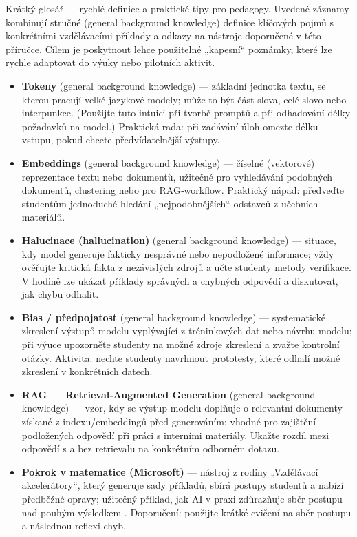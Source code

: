 \documentclass{report}%
\begin{document}
%
Krátký glosář — rychlé definice a praktické tipy pro pedagogy. Uvedené záznamy kombinují stručné (general background knowledge) definice klíčových pojmů s konkrétními vzdělávacími příklady a odkazy na nástroje doporučené v této příručce. Cílem je poskytnout lehce použitelné „kapesní“ poznámky, které lze rychle adaptovat do výuky nebo pilotních aktivit.
\begin{itemize}
\item \textbf{Tokeny} (general background knowledge) --- základní jednotka textu, se kterou pracují velké jazykové modely; může to být část slova, celé slovo nebo interpunkce. (Použijte tuto intuici při tvorbě promptů a při odhadování délky požadavků na model.) Praktická rada: při zadávání úloh omezte délku vstupu, pokud chcete předvídatelnější výstupy.
\item \textbf{Embeddings} (general background knowledge) --- číselné (vektorové) reprezentace textu nebo dokumentů, užitečné pro vyhledávání podobných dokumentů, clustering nebo pro RAG‑workflow. Praktický nápad: předveďte studentům jednoduché hledání „nejpodobnějších“ odstavců z učebních materiálů.
\item \textbf{Halucinace (hallucination)} (general background knowledge) --- situace, kdy model generuje fakticky nesprávné nebo nepodložené informace; vždy ověřujte kritická fakta z nezávislých zdrojů a učte studenty metody verifikace. V hodině lze ukázat příklady správných a chybných odpovědí a diskutovat, jak chybu odhalit.
\item \textbf{Bias / předpojatost} (general background knowledge) --- systematické zkreslení výstupů modelu vyplývající z tréninkových dat nebo návrhu modelu; při výuce upozorněte studenty na možné zdroje zkreslení a zvažte kontrolní otázky. Aktivita: nechte studenty navrhnout prototesty, které odhalí možné zkreslení v konkrétních datech.
\item \textbf{RAG — Retrieval‑Augmented Generation} (general background knowledge) --- vzor, kdy se výstup modelu doplňuje o relevantní dokumenty získané z indexu/embeddingů před generováním; vhodné pro zajištění podložených odpovědí při práci s interními materiály. Ukažte rozdíl mezi odpovědí s a bez retrievalu na konkrétním odborném dotazu.
\item \textbf{Pokrok v matematice (Microsoft)} --- nástroj z rodiny „Vzdělávací akcelerátory“, který generuje sady příkladů, sbírá postupy studentů a nabízí předběžné opravy; užitečný příklad, jak AI v praxi zdůrazňuje sběr postupu nad pouhým výsledkem \cite{kb_ai_101_tipu_pdf_04e4a115_page_8_1}. Doporučení: použijte krátké cvičení na sběr postupu a následnou reflexi chyb.

\end{itemize}
\end{document}
